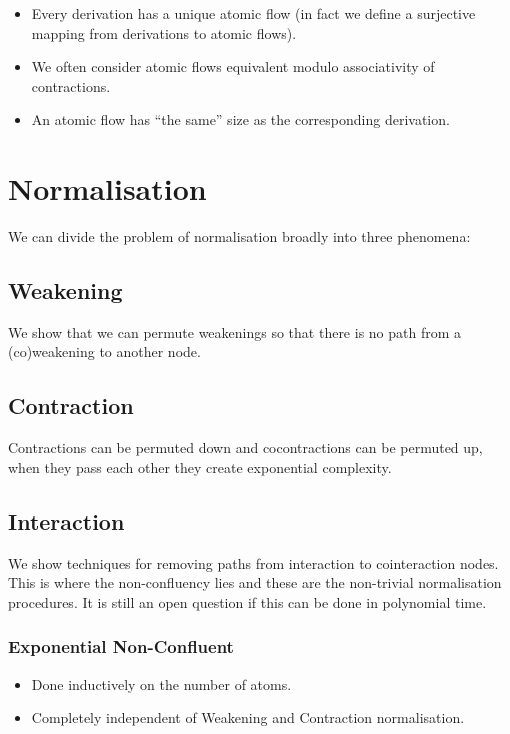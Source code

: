 \documentclass[12pt]{article}
\begin{document}
\begin{itemize}
\item Every derivation has a unique atomic flow (in fact we define a surjective mapping from derivations to atomic flows).
\item We often consider atomic flows equivalent modulo associativity of contractions.
\item An atomic flow has ``the same'' size as the corresponding derivation.
\end{itemize}

\section{Normalisation}

We can divide the problem of normalisation broadly into three phenomena:

\subsection{Weakening}

We show that we can permute weakenings so that there is no path from a (co)weakening to another node.

\subsection{Contraction}

Contractions can be permuted down and cocontractions can be permuted up, when they pass each other they create exponential complexity.

\subsection{Interaction}

We show techniques for removing paths from interaction to cointeraction nodes. This is where the non-confluency lies and these are the non-trivial normalisation procedures. It is still an open question if this can be done in polynomial time.

\subsubsection{Exponential Non-Confluent}

\begin{itemize}
\item Done inductively on the number of atoms.
\item Completely independent of Weakening and Contraction normalisation.
\end{itemize}
\end{document}
